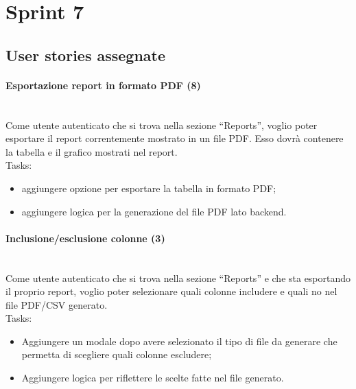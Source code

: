 
\section{Sprint 7}
\label{sec:sprint7}

\subsection{User stories assegnate}

\paragraph{Esportazione report in formato PDF (8)}\mbox{} \\[\baselineskip]
Come utente autenticato che si trova nella sezione “Reports”, voglio poter esportare il report correntemente mostrato in un file PDF.
Esso dovrà contenere la tabella e il grafico mostrati nel report.\\

\noindent Tasks:
\begin{itemize}
  \item aggiungere opzione per esportare la tabella in formato PDF;
  \item aggiungere logica per la generazione del file PDF lato backend.
\end{itemize}

\paragraph{Inclusione/esclusione colonne (3)}\mbox{} \\[\baselineskip]
Come utente autenticato che si trova nella sezione “Reports” e che sta esportando il proprio report, voglio poter selezionare quali colonne includere e quali no nel file PDF/CSV generato.\\

\noindent Tasks:
\begin{itemize}
  \item Aggiungere un modale dopo avere selezionato il tipo di file da generare che permetta di scegliere quali colonne escludere;
  \item Aggiungere logica per riflettere le scelte fatte nel file generato.
\end{itemize}

